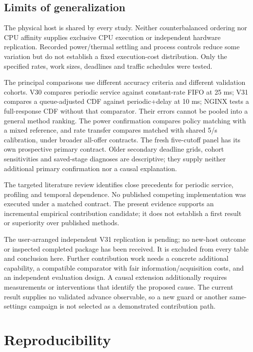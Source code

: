\documentclass[11pt,a4paper]{article}
\begin{document}
\subsection{Limits of generalization}

The physical host is shared by every study. Neither counterbalanced ordering
nor CPU affinity supplies exclusive CPU execution or independent hardware
replication. Recorded power/thermal settling and process controls reduce some
variation but do not establish a fixed execution-cost distribution. Only the
specified rates, work sizes, deadlines and traffic schedules were tested.

The principal comparisons use different accuracy criteria and different
validation cohorts. V30 compares periodic service against constant-rate FIFO
at 25 ms; V31 compares a queue-adjusted CDF against periodic+delay at
10 ms; NGINX tests a full-response CDF without that comparator. Their errors
cannot be pooled into a general method ranking. The power confirmation compares
policy matching with a mixed reference, and rate transfer compares matched with
shared 5/s calibration, under broader all-offer contracts. The fresh five-cutoff panel has its own prospective primary contract. Older
secondary deadline grids, cohort sensitivities and saved-stage diagnoses are
descriptive; they supply
neither additional primary confirmation nor a causal explanation.

The targeted literature review identifies close precedents for periodic service,
profiling and temporal dependence. No published competing implementation was
executed under a matched contract. The present evidence supports an incremental
empirical contribution candidate; it does not establish a first result or
superiority over published methods.

The user-arranged independent V31 replication is pending; no new-host outcome
or inspected completed package has been received. It is excluded from every
table and conclusion here. Further contribution work needs a concrete additional
capability, a compatible comparator with fair information/acquisition costs,
and an independent evaluation design. A causal extension additionally requires
measurements or interventions that identify the proposed cause. The current
result supplies no validated advance observable, so a new guard or another
same-settings campaign is not selected as a demonstrated contribution path.

\section{Reproducibility}
\end{document}
